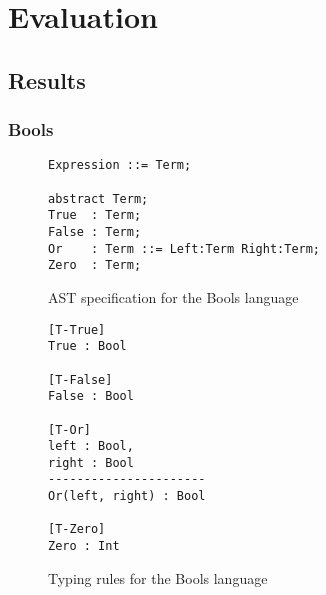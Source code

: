 \documentclass[nofilelist]{cslthse-msc}
\begin{document}
%


\chapter{Evaluation} %
\section{Results} %
\subsection{Bools}

\begin{figure}[h]
\begin{lstlisting}[]
Expression ::= Term;

abstract Term;
True  : Term;
False : Term;
Or    : Term ::= Left:Term Right:Term;
Zero  : Term;
\end{lstlisting}
  \caption{AST specification for the Bools language}
  \label{boolsast}
\end{figure}
\begin{figure}[h]
\begin{lstlisting}[]
[T-True]
True : Bool

[T-False]
False : Bool

[T-Or]
left : Bool,
right : Bool
----------------------
Or(left, right) : Bool

[T-Zero]
Zero : Int
\end{lstlisting}
  \caption{Typing rules for the Bools language}
  \label{boolstr}
\end{figure}
\end{document}
